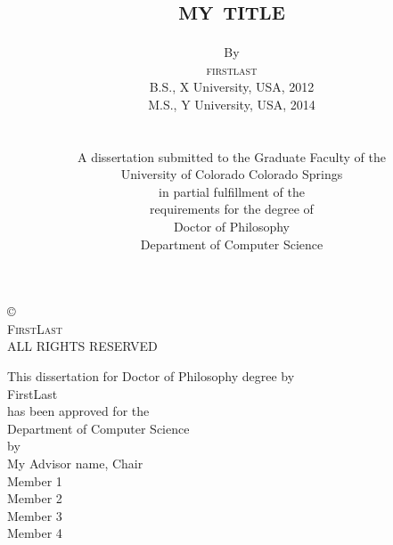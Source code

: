 \documentclass[12pt]{style/Diss_style} %
\newcommand\textlcsc[1]{\textsc{\MakeLowercase{#1}}}
\newcommand{\myfirstname}{First}
\newcommand{\mylastname}{Last}
\newcommand{\myadvisor}{My Advisor name}
\newcommand{\mytitle}{My Title}
\begin{document}
\title{\textlcsc{{\LARGE \mytitle}}}
\author{By \\
\textlcsc{\large \myfirstname \mylastname} \\
B.S., X University, USA, 2012\\
M.S., Y University, USA, 2014\\
\\ 
\\ 
A dissertation submitted to the Graduate Faculty of the\\
University of Colorado Colorado Springs\\
in partial fulfillment of the\\
requirements for the degree of\\
Doctor of Philosophy \\
Department of Computer Science\\
\the\year}
\maketitle
\thispagestyle{empty}
\begin{center}

	\vspace*{\fill}
	\copyright \space \the\year \\ \textsc{\myfirstname \mylastname} \\
	ALL RIGHTS RESERVED\rm
	\end{center}
%
\begin{minipage}{5.0in}

\end{minipage}
\newpage


\begin{center}
	This dissertation for Doctor of Philosophy degree by\\
	\myfirstname \mylastname\\
	has been approved for the \\
 	Department of Computer Science \\
	by \\ %
	\vspace{3.0pc}
	\myadvisor, Chair \\
	\vspace{2.0pc}
    Member 1 \\
	\vspace{2.0pc}
	Member 2 \\
	\vspace{2.0pc}
	Member 3 \\
	\vspace{2.0pc}
	Member 4 \\
\end{center}
\end{document}
